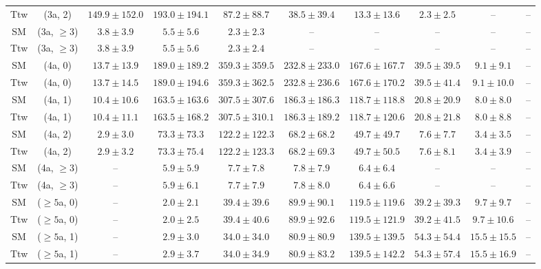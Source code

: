 \begin{table}[h!]
{\begin{tabular}{cccccccccc}
	Ttw & (3a, 2) & $149.9\pm 152.0$ & $193.0\pm 194.1$ & $87.2\pm 88.7$ & $38.5\pm 39.4$ & $13.3\pm 13.6$ & $2.3\pm 2.5$ & -- & -- \\[0.5ex] 
	SM & (3a, $\ge3$) & $3.8\pm 3.9$ & $5.5\pm 5.6$ & $2.3\pm 2.3$ & -- & -- & -- & -- & -- \\[0.5ex] 
	Ttw & (3a, $\ge3$) & $3.8\pm 3.9$ & $5.5\pm 5.6$ & $2.3\pm 2.4$ & -- & -- & -- & -- & -- \\[0.5ex] 
	SM & (4a, 0) & $13.7\pm 13.9$ & $189.0\pm 189.2$ & $359.3\pm 359.5$ & $232.8\pm 233.0$ & $167.6\pm 167.7$ & $39.5\pm 39.5$ & $9.1\pm 9.1$ & -- \\[0.5ex] 
	Ttw & (4a, 0) & $13.7\pm 14.5$ & $189.0\pm 194.6$ & $359.3\pm 362.5$ & $232.8\pm 236.6$ & $167.6\pm 170.2$ & $39.5\pm 41.4$ & $9.1\pm 10.0$ & -- \\[0.5ex] 
	SM & (4a, 1) & $10.4\pm 10.6$ & $163.5\pm 163.6$ & $307.5\pm 307.6$ & $186.3\pm 186.3$ & $118.7\pm 118.8$ & $20.8\pm 20.9$ & $8.0\pm 8.0$ & -- \\[0.5ex] 
	Ttw & (4a, 1) & $10.4\pm 11.1$ & $163.5\pm 168.2$ & $307.5\pm 310.1$ & $186.3\pm 189.2$ & $118.7\pm 120.6$ & $20.8\pm 21.8$ & $8.0\pm 8.8$ & -- \\[0.5ex] 
	SM & (4a, 2) & $2.9\pm 3.0$ & $73.3\pm 73.3$ & $122.2\pm 122.3$ & $68.2\pm 68.2$ & $49.7\pm 49.7$ & $7.6\pm 7.7$ & $3.4\pm 3.5$ & -- \\[0.5ex] 
	Ttw & (4a, 2) & $2.9\pm 3.2$ & $73.3\pm 75.4$ & $122.2\pm 123.3$ & $68.2\pm 69.3$ & $49.7\pm 50.5$ & $7.6\pm 8.1$ & $3.4\pm 3.9$ & -- \\[0.5ex] 
	SM & (4a, $\ge3$) & -- & $5.9\pm 5.9$ & $7.7\pm 7.8$ & $7.8\pm 7.9$ & $6.4\pm 6.4$ & -- & -- & -- \\[0.5ex] 
	Ttw & (4a, $\ge3$) & -- & $5.9\pm 6.1$ & $7.7\pm 7.9$ & $7.8\pm 8.0$ & $6.4\pm 6.6$ & -- & -- & -- \\[0.5ex] 
	SM & ($\ge5$a, 0) & -- & $2.0\pm 2.1$ & $39.4\pm 39.6$ & $89.9\pm 90.1$ & $119.5\pm 119.6$ & $39.2\pm 39.3$ & $9.7\pm 9.7$ & -- \\[0.5ex] 
	Ttw & ($\ge5$a, 0) & -- & $2.0\pm 2.5$ & $39.4\pm 40.6$ & $89.9\pm 92.6$ & $119.5\pm 121.9$ & $39.2\pm 41.5$ & $9.7\pm 10.6$ & -- \\[0.5ex] 
	SM & ($\ge5$a, 1) & -- & $2.9\pm 3.0$ & $34.0\pm 34.0$ & $80.9\pm 80.9$ & $139.5\pm 139.5$ & $54.3\pm 54.4$ & $15.5\pm 15.5$ & -- \\[0.5ex] 
	Ttw & ($\ge5$a, 1) & -- & $2.9\pm 3.7$ & $34.0\pm 34.9$ & $80.9\pm 83.2$ & $139.5\pm 142.2$ & $54.3\pm 57.4$ & $15.5\pm 16.9$ & -- \\[0.5ex] 

\end{tabular}}
\end{table}
